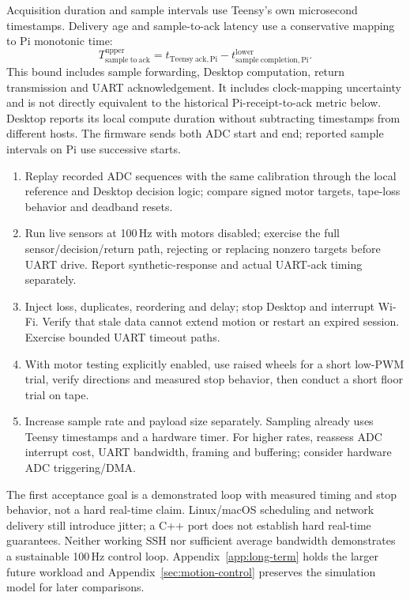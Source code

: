 Acquisition duration and sample intervals use Teensy's own microsecond timestamps. Delivery age and sample-to-ack latency use a conservative mapping to Pi monotonic time:
\begin{equation}
T_{\mathrm{sample\ to\ ack}}^{\mathrm{upper}}=t_{\mathrm{Teensy\ ack,Pi}}-t_{\mathrm{sample\ completion,Pi}}^{\mathrm{lower}}.
\end{equation}
This bound includes sample forwarding, Desktop computation, return transmission and UART acknowledgement. It includes clock-mapping uncertainty and is not directly equivalent to the historical Pi-receipt-to-ack metric below. Desktop reports its local compute duration without subtracting timestamps from different hosts. The firmware sends both ADC start and end; reported sample intervals on Pi use successive starts.

\begin{enumerate}
\item Replay recorded ADC sequences with the same calibration through the local reference and Desktop decision logic; compare signed motor targets, tape-loss behavior and deadband resets.
\item Run live sensors at 100\,Hz with motors disabled; exercise the full sensor/decision/return path, rejecting or replacing nonzero targets before UART drive. Report synthetic-response and actual UART-ack timing separately.
\item Inject loss, duplicates, reordering and delay; stop Desktop and interrupt Wi-Fi. Verify that stale data cannot extend motion or restart an expired session. Exercise bounded UART timeout paths.
\item With motor testing explicitly enabled, use raised wheels for a short low-PWM trial, verify directions and measured stop behavior, then conduct a short floor trial on tape.
\item Increase sample rate and payload size separately. Sampling already uses Teensy timestamps and a hardware timer. For higher rates, reassess ADC interrupt cost, UART bandwidth, framing and buffering; consider hardware ADC triggering/DMA.
\end{enumerate}

The first acceptance goal is a demonstrated loop with measured timing and stop behavior, not a hard real-time claim. Linux/macOS scheduling and network delivery still introduce jitter; a C++ port does not establish hard real-time guarantees. Neither working SSH nor sufficient average bandwidth demonstrates a sustainable 100\,Hz control loop. Appendix~\ref{app:long-term} holds the larger future workload and Appendix~\ref{sec:motion-control} preserves the simulation model for later comparisons.

